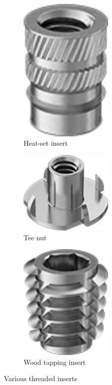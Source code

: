 \begin{figure}[H]
		\begin{subfigure}[b]{.24\linewidth}
			\includegraphics[width=0.5\textwidth]{imgs/heatset.png}
			\caption{Heat-set insert}
		\end{subfigure}\begin{subfigure}[b]{.24\linewidth}
			\includegraphics[width=0.5\textwidth]{imgs/teenut.png}
			\caption{Tee nut}
		\end{subfigure}\begin{subfigure}[b]{.24\linewidth}
			\includegraphics[width=0.5\textwidth]{imgs/woodsti.png}
			\caption{Wood tapping insert}
		\end{subfigure}
		\caption{Various threaded inserts}
	\end{figure}
	
